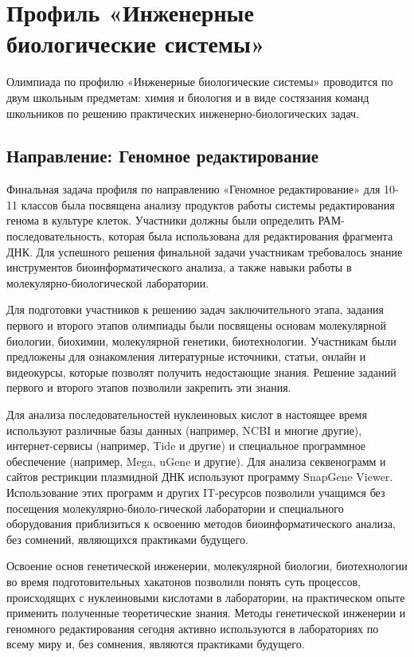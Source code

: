 

\chapter{Профиль «Инженерные биологические системы»}

Олимпиада по профилю «Инженерные биологические системы»  проводится по двум школьным предметам: химия и биология и в виде состязания команд школьников по решению практических инженерно-биологических задач.

\section*{Направление: Геномное редактирование}

Финальная задача профиля по направлению «Геномное редактирование» для 10-11 классов была посвящена анализу продуктов работы системы редактирования генома в культуре клеток. Участники должны были определить РАМ-последовательность, которая была использована для редактирования фрагмента ДНК. Для успешного решения финальной задачи участникам требовалось знание инструментов биоинформатического анализа, а также навыки работы в молекулярно-биологической лаборатории. 

Для подготовки участников к решению задач заключительного этапа, задания первого и второго этапов олимпиады были посвящены основам молекулярной биологии, биохимии, молекулярной генетики, биотехнологии. Участникам были предложены для ознакомления литературные источники, статьи, онлайн и видеокурсы, которые позволят получить недостающие знания. Решение заданий первого и второго этапов позволили закрепить эти знания. 

Для анализа последовательностей нуклеиновых кислот в настоящее время используют различные базы данных (например, NCBI и многие другие), интернет-сервисы (например, Tide и другие) и специальное программное обеспечение (например, Mega, uGene и другие). Для анализа секвенограмм и сайтов рестрикции плазмидной ДНК используют программу SnapGene Viewer. Использование этих программ и других IT-ресурсов позволили учащимся без посещения молекулярно-биоло-гической лаборатории и специального оборудования приблизиться к освоению методов биоинформатического анализа, без сомнений, являющихся практиками будущего. 

Освоение основ генетической инженерии, молекулярной биологии, биотехнологии во время подготовительных хакатонов позволили понять суть процессов, происходящих с нуклеиновыми кислотами в лаборатории, на практическом опыте применить полученные теоретические знания. Методы генетической инженерии и геномного редактирования сегодня активно используются в лабораториях по всему миру и, без сомнения, являются практиками будущего. 

